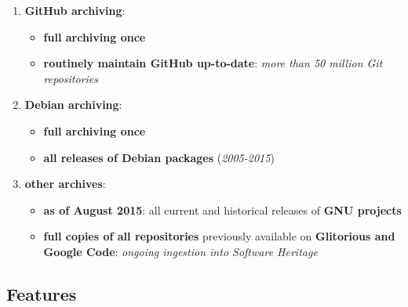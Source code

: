 \documentclass[11pt]{article}
\providecommand{\tightlist}{%
      \setlength{\itemsep}{0pt}\setlength{\parskip}{0pt}}
\begin{document}
\begin{enumerate}
\def\labelenumi{\arabic{enumi}.}
\tightlist
\item
  \textbf{GitHub archiving}:

  \begin{itemize}
  \tightlist
  \item
    \textbf{full archiving once}
  \item
    \textbf{routinely maintain GitHub up-to-date}: \emph{more than 50
    million Git repositories}
  \end{itemize}
\item
  \textbf{Debian archiving}:

  \begin{itemize}
  \tightlist
  \item
    \textbf{full archiving once}
  \item
    \textbf{all releases of Debian packages} (\emph{2005-2015})
  \end{itemize}
\item
  \textbf{other archives}:

  \begin{itemize}
  \tightlist
  \item
    \textbf{as of August 2015}: all current and historical releases of
    \textbf{GNU projects}
  \item
    \textbf{full copies of all repositories} previously available on
    \textbf{Glitorious and Google Code}: \emph{ongoing ingestion into
    Software Heritage}
  \end{itemize}
\end{enumerate}

\hypertarget{features}{%
\subsection{Features}\label{features}}
\end{document}
